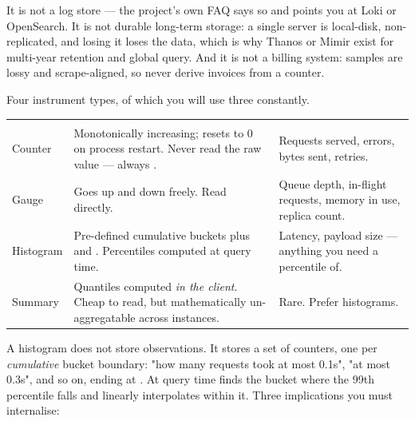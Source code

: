  It is not a log store --- the project's own FAQ says so and points you at Loki or OpenSearch. It is not durable long-term storage: a single server is local-disk, non-replicated, and losing it loses the data, which is why Thanos or Mimir exist for multi-year retention and global query. And it is not a billing system: samples are lossy and scrape-aligned, so never derive invoices from a counter.


 Four instrument types, of which you will use three constantly.

\begin{center}\small
\wbrowcolors
\begin{tabularx}{\linewidth}{@{}L{22mm} X L{32mm}@{}}
 &  & \\
Counter & Monotonically increasing; resets to 0 on process restart. Never read the raw value --- always . & Requests served, errors, bytes sent, retries.\\
Gauge & Goes up and down freely. Read directly. & Queue depth, in-flight requests, memory in use, replica count.\\
Histogram & Pre-defined cumulative buckets plus  and . Percentiles computed at query time. & Latency, payload size --- anything you need a percentile of.\\
Summary & Quantiles computed \emph{in the client}. Cheap to read, but mathematically un-aggregatable across instances. & Rare. Prefer histograms.\\
\end{tabularx}
\end{center}

 A histogram does not store observations. It stores a set of counters, one per \emph{cumulative} bucket boundary: "how many requests took at most 0.1s", "at most 0.3s", and so on, ending at . At query time  finds the bucket where the 99th percentile falls and linearly interpolates within it. Three implications you must internalise:

